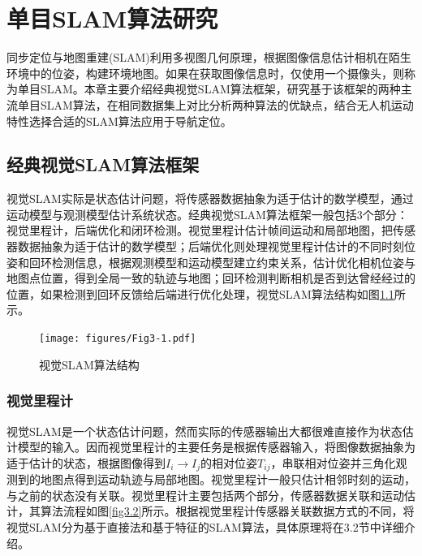 
\chapter{单目SLAM算法研究}
\label{chap:ALGORITHM}

同步定位与地图重建(SLAM)利用多视图几何原理\upcite{[1.1]}，根据图像信息估计相机在陌生环境中的位姿，构建环境地图。如果在获取图像信息时，仅使用一个摄像头，则称为单目SLAM。本章主要介绍经典视觉SLAM算法框架，研究基于该框架的两种主流单目SLAM算法，在相同数据集上对比分析两种算法的优缺点，结合无人机运动特性选择合适的SLAM算法应用于导航定位。

\section{经典视觉SLAM算法框架}
视觉SLAM实际是状态估计问题，将传感器数据抽象为适于估计的数学模型，通过运动模型与观测模型估计系统状态。经典视觉SLAM算法框架\upcite{[3.1]}一般包括3个部分：视觉里程计，后端优化和闭环检测。视觉里程计估计帧间运动和局部地图，把传感器数据抽象为适于估计的数学模型；后端优化则处理视觉里程计估计的不同时刻位姿和回环检测信息，根据观测模型和运动模型建立约束关系，估计优化相机位姿与地图点位置，得到全局一致的轨迹与地图；回环检测判断相机是否到达曾经经过的位置，如果检测到回环反馈给后端进行优化处理，视觉SLAM算法结构如图\ref{fig3.1}所示。

\begin{figure}[h]
\centering
\texttt{[image: figures/Fig3-1.pdf]}
\caption{视觉SLAM算法结构}
\label{fig3.1}
\end{figure}

\subsection{视觉里程计}
视觉SLAM是一个状态估计问题，然而实际的传感器输出大都很难直接作为状态估计模型的输入。因而视觉里程计的主要任务是根据传感器输入，将图像数据抽象为适于估计的状态，根据图像得到$I_i \rightarrow I_j$的相对位姿$T_{ij}$，串联相对位姿并三角化观测到的地图点得到运动轨迹与局部地图。视觉里程计一般只估计相邻时刻的运动，与之前的状态没有关联。视觉里程计主要包括两个部分，传感器数据关联和运动估计\upcite{[1.39]}，其算法流程如图\ref{fig3.2}所示。根据视觉里程计传感器关联数据方式的不同，将视觉SLAM分为基于直接法和基于特征的SLAM算法，具体原理将在3.2节中详细介绍。

